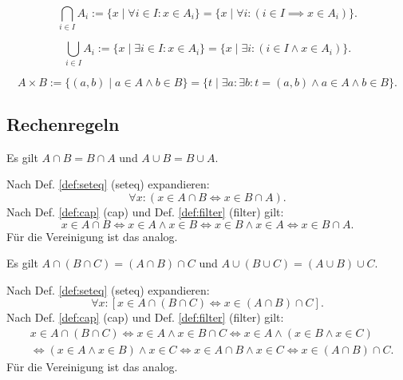 \begin{Definition}\label{def:intersection}
\[\bigcap_{i\in I} A_i := \{x\mid \forall i{\in}I\colon x\in A_i\}
= \{x\mid \forall i\colon (i\in I\implies x\in A_i)\}.\]
\end{Definition}

\begin{Definition}\label{def:union}
\[\bigcup_{i\in I} A_i := \{x\mid \exists i{\in}I\colon x\in A_i\}
= \{x\mid \exists i\colon (i\in I\land x\in A_i)\}.\]
\end{Definition}

\begin{Definition}%
\label{def:cart}
\[A\times B := \{(a,b)\mid a\in A\land b\in B\}
= \{t\mid\exists a\colon\exists b\colon t=(a,b)\land a\in A\land b\in B\}.\]
\end{Definition}

\subsection{Rechenregeln}

\begin{Satz}[Kommutativgesetze]
Es gilt $A\cap B = B\cap A$ und $A\cup B = B\cup A$.
\end{Satz}

\begin{Beweis}
Nach Def. \ref{def:seteq} (seteq) expandieren:
\[\forall x\colon (x\in A\cap B \iff x\in B\cap A).\]
Nach Def. \ref{def:cap} (cap) und Def. \ref{def:filter} (filter) gilt:
\[x\in A\cap B \iff x\in A\land x\in B \iff x\in B\land x\in A
\iff x\in B\cap A.\]
Für die Vereinigung ist das analog.\,\qedsymbol
\end{Beweis}

\begin{Satz}[Assoziativgesetze]%
Es gilt $A\cap (B\cap C) = (A\cap B)\cap C$
und $A\cup (B\cup C) = (A\cup B)\cup C$.
\end{Satz}

\begin{Beweis}
Nach Def. \ref{def:seteq} (seteq) expandieren:
\[\forall x\colon [x\in A\cap (B\cap C) \iff x\in (A\cap B)\cap C].\]
Nach Def. \ref{def:cap} (cap) und Def. \ref{def:filter} (filter) gilt:
\begin{align*}
&x\in A\cap (B\cap C) \iff x\in A\land x\in B\cap C
\iff x\in A\land (x\in B\land x\in C)\\
&\iff (x\in A\land x\in B)\land x\in C
\iff x\in A\cap B\land x\in C
\iff x\in (A\cap B)\cap C.
\end{align*}
Für die Vereinigung ist das analog.\,\qedsymbol
\end{Beweis}

